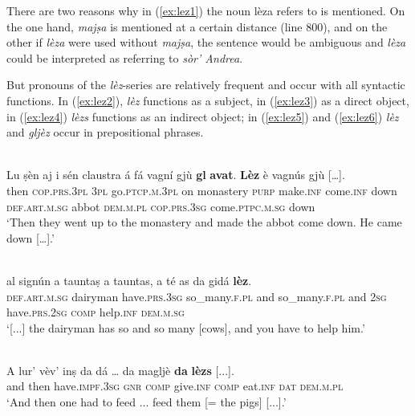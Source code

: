 There are two reasons why in (\ref{ex:lez1}) the noun lèza refers to is mentioned. On the one hand, \textit{majṣa} is mentioned at a certain distance (line 800), and on the other if \textit{lèza} were used without \textit{majṣa}, the sentence would be ambiguous and \textit{lèza} could be interpreted as referring to \textit{sòr' Andrea}.
 
 But pronouns of the \textit{lèz}-series are relatively frequent and occur with all syntactic functions. In (\ref{ex:lez2}), \textit{lèz} functions as a subject, in (\ref{ex:lez3}) as a direct object, in (\ref{ex:lez4}) \textit{lèzs} functions as an indirect object; in (\ref{ex:lez5}) and (\ref{ex:lez6}) \textit{lèz} and \textit{gljèz} occur in prepositional phrases.
 
\ea
\label{ex:lez2}
\\
\gll Lu ṣèn aj i sén claustra á fá vagní gjù \textbf{gl} \textbf{avat}. \textbf{Lèz} è vagnús gjù […].\\
     then \textsc{cop.prs.3pl} \textsc{3pl} go.\textsc{ptcp.m.3pl} on monastery \textsc{purp} make.\textsc{inf} come.\textsc{inf} down \textsc{def.art.m.sg} abbot \textsc{dem.m.pl} \textsc{cop.prs.3sg} come.\textsc{ptpc.m.sg} down\\
\glt `Then they went up to the monastery and made the abbot come down. He came down […].'
\z

\ea
\label{ex:lez3}
\\
	\gll [...] al signún a tauntaṣ a tauntas, a té as da gidá \textbf{lèz}.\\
{} \textsc{def.art.m.sg} dairyman have\textsc{.prs.3sg} so\_many.\textsc{f.pl} and so\_many.\textsc{f.pl} and \textsc{2sg} have.\textsc{prs.2sg} \textsc{comp} help.\textsc{inf} \textsc{dem.m.sg}	\\
\glt `[...] the dairyman has so and so many [cows], and you have to help him.'
\z

\ea
\label{ex:lez4}
\\
\gll A lur' vèv’ inṣ da dá … da magljè \textbf{da} \textbf{lèzs} [...].\\
and then have.\textsc{impf.3sg} \textsc{gnr} \textsc{comp} give.\textsc{inf} {} \textsc{comp} eat.\textsc{inf} \textsc{dat} \textsc{dem.m.pl}\\
\glt `And then one had to feed ... feed them [= the pigs] [...].'
\z

